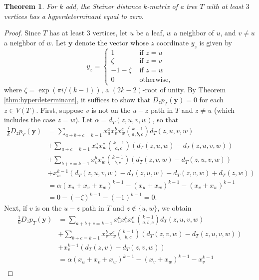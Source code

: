 \documentclass{article}
\newtheorem{theorem}{Theorem}[section]
\begin{document}
\begin{theorem}
    For $k$ odd, the Steiner distance $k$-matrix of a tree $T$ with at least $3$ vertices has a hyperdeterminant equal to zero. 
\end{theorem}
\begin{proof}
    Since $T$ has at least $3$ vertices, let $u$ be a leaf, $w$ a neighbor of $u$, and $v \neq u$ a neighbor of $w$.  Let $\mathbf{y}$ denote the vector whose $z$ coordinate $y_z$ is given by
    $$
    y_z = \left \{ \begin{array}{ll} 
    1 & \textrm{ if } z=u \\
    \zeta & \textrm{ if } z=v \\
    -1-\zeta & \textrm{ if } z=w \\
    0 & \textrm{ otherwise,} 
    \end{array} \right .
    $$
    where $\zeta = \exp(\pi i/(k-1))$, a $(2k-2)$-root of unity. By Theorem \ref{thm:hyperdeterminant}, it suffices to show that $D_z p_T (\mathbf{y}) = 0$ for each $z \in V(T)$.  First, suppose $v$ is not on the $u-z$ path in $T$ and $z \neq u$ (which includes the case $z=w$).  Let $\alpha = d_T(z,u,v,w)$, so that
    \begin{align*}
        \frac{1}{k} D_z p_T (\mathbf{y}) &= \sum_{a+b+c=k-1} x_u^a x_v^b x_w^c \binom{k-1}{a,b,c} d_T(z,u,v,w) \\
        & + \sum_{a+c=k-1} x_u^a x_w^c \binom{k-1}{a,c} (d_T(z,u,w)-d_T(z,u,v,w)) \\
        & + \sum_{b+c=k-1} x_v^b x_w^c \binom{k-1}{b,c} (d_T(z,v,w)-d_T(z,u,v,w)) \\
        & + x_w^{k-1} (d_T(z,u,v,w)-d_T(z,u,w)-d_T(z,v,w)+d_T(z,w)) \\
        &= \alpha (x_u+x_v+x_w)^{k-1} - (x_u+x_w)^{k-1} - (x_v+x_w)^{k-1} \\
        &= 0 - (-\zeta)^{k-1} - (-1)^{k-1} = 0.
    \end{align*}
    Next, if $v$ is on the $u-z$ path in $T$ and $z \not \in \{u,w\}$, we obtain
    \begin{align*}
        \frac{1}{k} D_z p_T (\mathbf{y}) &= \sum_{a+b+c=k-1} x_u^a x_v^b x_w^c \binom{k-1}{a,b,c} d_T(z,u,v,w) \\
        & + \sum_{b+c=k-1} x_v^b x_w^c \binom{k-1}{b,c} (d_T(z,v,w)-d_T(z,u,v,w)) \\
        & + x_v^{k-1} (d_T(z,v)-d_T(z,v,w))\\
        &= \alpha (x_u+x_v+x_w)^{k-1} - (x_v+x_w)^{k-1} - x_v^{k-1} \\

\end{align*}
\end{proof}
\end{document}
